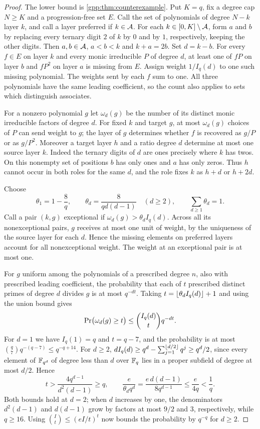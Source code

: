 \begin{proof}
The lower bound is \cref{gpp:thm:counterexample}. Put $K=q$, fix a degree cap $N\ge K$
and a progression-free set $E$. Call the set of polynomials of degree $N-k$ layer $k$,
and call a layer preferred if $k\in\mathcal{A}$. For each $k\in[0,K]\setminus\mathcal{A}$, form $a$
and $b$ by replacing every ternary digit $2$ of $k$ by $0$ and by $1$, respectively,
keeping the other digits. Then $a,b\in\mathcal{A}$, $a<b<k$ and $k+a=2b$. Set $d=k-b$. For
every $f\in E$ on layer $k$ and every monic irreducible $P$ of degree $d$, at least one
of $fP$ on layer $b$ and $fP^2$ on layer $a$ is missing from $E$. Assign weight
$1/I_q(d)$ to one such missing polynomial. The weights sent by each $f$ sum to one. All
three polynomials have the same leading coefficient, so the count also applies to sets
which distinguish associates.

For a nonzero polynomial $g$ let $\omega_d(g)$ be the number of its distinct monic
irreducible factors of degree $d$. For fixed $k$ and target $g$, at most $\omega_d(g)$
choices of $P$ can send weight to $g$; the layer of $g$ determines whether $f$ is
recovered as $g/P$ or as $g/P^2$. Moreover a target layer $h$ and a ratio degree $d$
determine at most one source layer $k$. Indeed the ternary digits of $d$ are ones
precisely where $k$ has twos. On this nonempty set of positions $b$ has only ones and $a$
has only zeros. Thus $h$ cannot occur in both roles for the same $d$, and the role fixes
$k$ as $h+d$ or $h+2d$.

Choose
\[
 \theta_1=1-\frac8q,\qquad\theta_d=\frac{8}{qd(d-1)}\quad(d\ge2),\qquad
 \sum_{d\ge1}\theta_d=1 .
\]
Call a pair $(k,g)$ exceptional if $\omega_d(g)>\theta_dI_q(d)$. Across all its
nonexceptional pairs, $g$ receives at most one unit of weight, by the uniqueness of the
source layer for each $d$. Hence the missing elements on preferred layers account for all
nonexceptional weight. The weight at an exceptional pair is at most one.

For $g$ uniform among the polynomials of a prescribed degree $n$, also with prescribed
leading coefficient, the probability that each of $t$ prescribed distinct primes of
degree $d$ divides $g$ is at most $q^{-dt}$. Taking $t=\lfloor\theta_dI_q(d)\rfloor+1$ and
using the union bound gives
\[
 \operatorname{Pr}\bigl(\omega_d(g)\ge t\bigr)\le\binom{I_q(d)}{t}q^{-dt}.
\]
For $d=1$ we have $I_q(1)=q$ and $t=q-7$, and the probability is at most
$\binom q7q^{-(q-7)}\le q^{-q+14}$. For $d\ge2$,
$dI_q(d)\ge q^d-\sum_{j=1}^{\lfloor d/2\rfloor}q^j\ge q^d/2$, since every element of
$\mathbb{F}_{q^d}$ of degree less than $d$ over $\mathbb{F}_q$ lies in a proper subfield of degree at most
$d/2$. Hence
\[
 t>\frac{4q^{d-1}}{d^2(d-1)}\ge q,\qquad
 \frac{e}{\theta_dq^d}=\frac{e\,d(d-1)}{8q^{d-1}}\le\frac{e}{4q}<\frac1q .
\]
Both bounds hold at $d=2$; when $d$ increases by one, the denominators $d^2(d-1)$ and
$d(d-1)$ grow by factors at most $9/2$ and $3$, respectively, while $q\ge16$. Using
$\binom{I}{t}\le(eI/t)^t$ now bounds the probability by $q^{-q}$ for $d\ge2$.


\end{proof}
